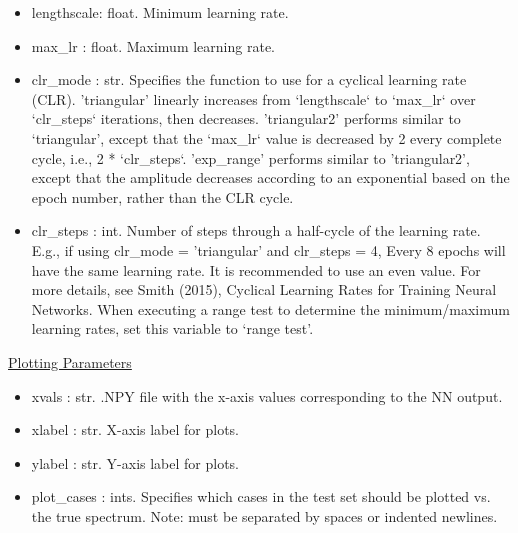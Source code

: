 \documentclass[letterpaper, 12pt]{article}
\begin{document}
\begin{itemize}
\item lengthscale: float. Minimum learning rate.
\item max\_lr     : float. Maximum learning rate.
\item clr\_mode   : str.   Specifies the function to use for a cyclical learning rate 
                    (CLR).
                    'triangular' linearly increases from `lengthscale` to 
                    `max\_lr` over `clr\_steps` iterations, then decreases.
                    'triangular2' performs similar to `triangular', except that 
                    the `max\_lr` value is decreased by 2 every complete cycle,
                    i.e., 2 * `clr\_steps`.
                    'exp\_range' performs similar to 'triangular2', except that 
                    the amplitude decreases according to an exponential based 
                    on the epoch number, rather than the CLR cycle.
\item clr\_steps  : int.   Number of steps through a half-cycle of the learning rate.
                    E.g., if using clr\_mode = 'triangular' and clr\_steps = 4, 
                    Every 8 epochs will have the same learning rate.
                    It is recommended to use an even value.
                    For more details, see Smith (2015), Cyclical Learning Rates 
                    for Training Neural Networks.
                    When executing a range test to determine the minimum/maximum
                    learning rates, set this variable to `range test'.
\end{itemize}

\noindent \underline{Plotting Parameters}
\begin{itemize}
\item xvals       : str.  .NPY file with the x-axis values corresponding to 
                          the NN output.
\item xlabel      : str.  X-axis label for plots.
\item ylabel      : str.  Y-axis label for plots.
\item plot\_cases : ints. Specifies which cases in the test set should be 
                   plotted vs. the true spectrum.
                   Note: must be separated by spaces or indented newlines.
\end{itemize}
\end{document}
